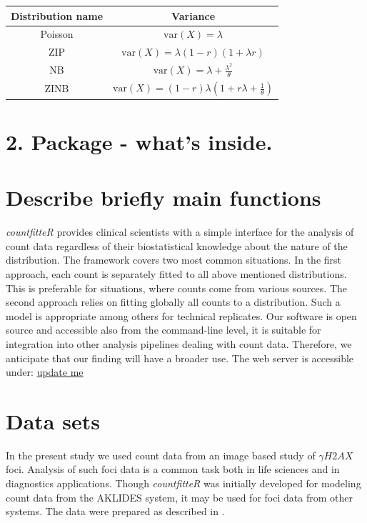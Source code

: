 \begin{center}
\begin{tabular}{ |c|c| } 
\hline
\bfseries Distribution name & \bfseries Variance \\
\hline
Poisson & $\textrm{var}(X) = \lambda $ \\
\hline
ZIP & $\textrm{var}(X) = \lambda (1 - r)(1 + \lambda r)$ \\
\hline
NB & $\textrm{var}(X) = \lambda + \frac{\lambda^2}{\theta} $ \\
\hline
ZINB & $\textrm{var}(X) = (1 - r) \lambda \left( 1 + r\lambda  + \frac{1}{\theta} \right)$ \\
\hline
\end{tabular}
\end{center}


\section{2. Package - what's inside.}


\section{Describe briefly main functions}

\emph{countfitteR} provides clinical scientists with a simple interface for the analysis of count data regardless of their biostatistical knowledge about the nature of the distribution. The framework covers two most common situations. In the first approach, each count is separately fitted to all above mentioned distributions. This is preferable for situations, where counts come from various sources. The second approach relies on fitting globally all counts to a distribution. Such a model is appropriate among others for technical replicates.
Our software is open source and accessible also from the command-line level, it is suitable for integration into other analysis pipelines dealing with count data. Therefore, we anticipate that our finding will have a broader use. 
The web server is accessible under: 
\url{update me}

\section{Data sets}
In the present study we used count data from an image based study of $\gamma H2AX$ foci. Analysis of such foci data is a common task both in life sciences and in diagnostics applications. Though \emph{countfitteR} was initially developed for modeling count data from the AKLIDES system, it may be used for foci data from other systems.
The data were prepared as described in \citep{rodiger_quantification_2018}.

